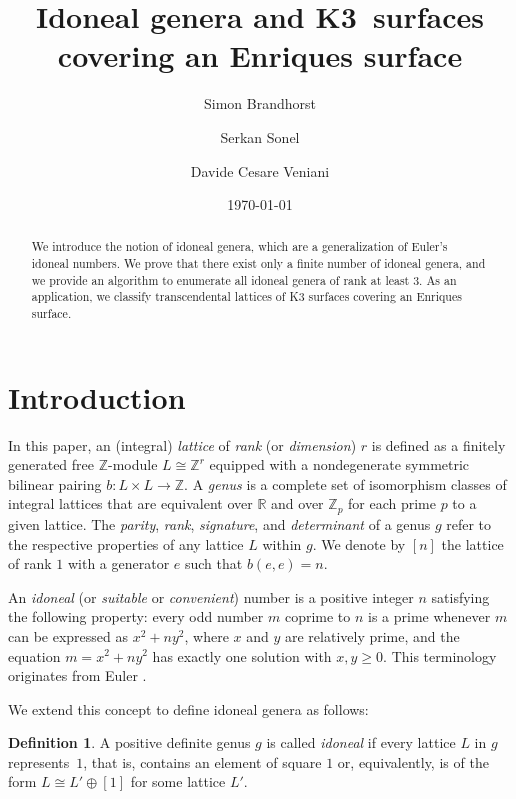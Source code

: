 \documentclass[a4paper]{amsart}
\title[Idoneal genera and K3 surfaces covering an Enriques surface]{Idoneal genera and K3~surfaces \\ covering an Enriques surface}
\author{Simon Brandhorst}
\author{Serkan Sonel}
\author{Davide Cesare Veniani}
\date{\today}
\theoremstyle{definition}
\newtheorem{definition}{Definition}[section]
\theoremstyle{plain}
\newcommand{\IR}{\mathbb{R}}
\newcommand{\IZ}{\mathbb{Z}}
\begin{document}
\begin{abstract}
    We introduce the notion of idoneal genera, which are a generalization of Euler's idoneal numbers. We prove that there exist only a finite number of idoneal genera, and we provide an algorithm to enumerate all idoneal genera of rank at least 3. As an application, we classify transcendental lattices of K3 surfaces covering an Enriques surface.
\end{abstract}

\maketitle

\section{Introduction}
In this paper, an (integral) \emph{lattice} of \emph{rank} (or \emph{dimension}) \(r\) is defined as a finitely generated free \(\IZ\)-module \(L \cong \IZ^r\) equipped with a nondegenerate symmetric bilinear pairing \(b \colon L \times L \to \IZ\).  
A \emph{genus} is a complete set of isomorphism classes of integral lattices that are equivalent over \(\IR\) and over \(\IZ_p\) for each prime \(p\) to a given lattice.  
The \emph{parity}, \emph{rank}, \emph{signature}, and \emph{determinant} of a genus \(g\) refer to the respective properties of any lattice \(L\) within \(g\).  
We denote by \([n]\) the lattice of rank \(1\) with a generator \(e\) such that \(b(e,e) = n\).

An \emph{idoneal} (or \emph{suitable} or \emph{convenient}) number is a positive integer \(n\) satisfying the following property: every odd number \(m\) coprime to \(n\) is a prime whenever \(m\) can be expressed as \(x^2 + n y^2\), where \(x\) and \(y\) are relatively prime, and the equation \(m = x^2 + ny^2\) has exactly one solution with \(x, y \geq 0\). This terminology originates from Euler \cite{euler:numeri.idonei}.  

We extend this concept to define idoneal genera as follows:

\begin{definition} \label{def:idoneal}
    A positive definite genus \(g\) is called \emph{idoneal} if every lattice \(L\) in \(g\) represents~\(1\), that is, contains an element of square \(1\) or, equivalently, is of the form \(L \cong L' \oplus [1]\) for some lattice \(L'\).
\end{definition}
\end{document}
